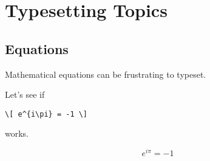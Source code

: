 \chapter{Typesetting Topics}

\section{Equations}

Mathematical equations can be frustrating to typeset.

Let's see if
\begin{verbatim}\[ e^{i\pi} = -1 \]\end{verbatim}
works.

\[ e^{i\pi} = -1 \]


